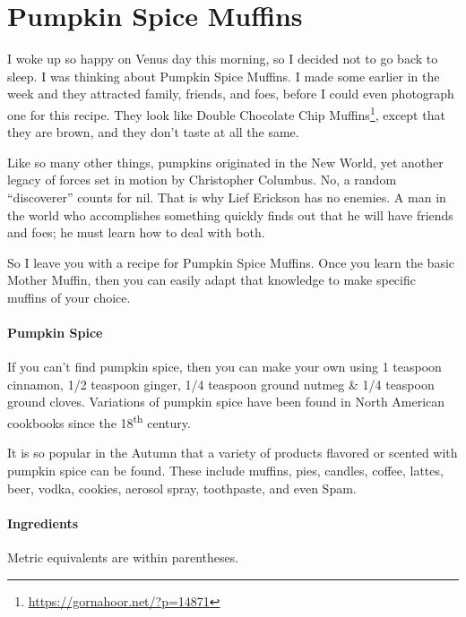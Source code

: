 \section{Pumpkin Spice Muffins}

I woke up so happy on Venus day this morning, so I decided not to go back to sleep. I was thinking about Pumpkin Spice Muffins. I made some earlier in the week and they attracted family, friends, and foes, before I could even photograph one for this recipe. They look like Double Chocolate Chip Muffins\footnote{\url{https://gornahoor.net/?p=14871}}, except that they are brown, and they don't taste at all the same.

Like so many other things, pumpkins originated in the New World, yet another legacy of forces set in motion by Christopher Columbus. No, a random ``discoverer'' counts for nil. That is why Lief Erickson has no enemies. A man in the world who accomplishes something quickly finds out that he will have friends and foes; he must learn how to deal with both.

So I leave you with a recipe for Pumpkin Spice Muffins. Once you learn the basic Mother Muffin, then you can easily adapt that knowledge to make specific muffins of your choice.

\paragraph{Pumpkin Spice}


If you can't find pumpkin spice, then you can make your own using 1 teaspoon cinnamon, 1/2 teaspoon ginger, 1/4 teaspoon ground nutmeg \& 1/4 teaspoon ground cloves. Variations of pumpkin spice have been found in North American cookbooks since the 18\textsuperscript{th} century.

It is so popular in the Autumn that a variety of products flavored or scented with pumpkin spice can be found. These include muffins, pies, candles, coffee, lattes, beer, vodka, cookies, aerosol spray, toothpaste, and even Spam.

\paragraph{Ingredients}


Metric equivalents are within parentheses.

